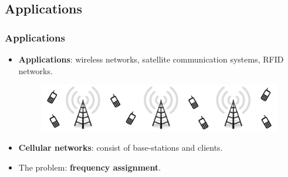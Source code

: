 \documentclass[xcolor=dvipsnames,aspectratio=1610]{beamer}
\begin{document}

  \subsection{Applications}


  \begin{frame}
    \frametitle{Applications}

    \begin{itemize}
      \item \textbf{Applications}: wireless networks, satellite communication systems, RFID networks.

      \pause
      \vfill

      \begin{figure}[h]
        \centering
        \includegraphics[width=12cm]{../figures/towers-slides.pdf}
      \end{figure}

      \vfill

      \item \textbf{Cellular networks}: consist of base-stations and clients.
      \pause
      \item The problem: \textbf{frequency assignment}.

    \end{itemize}

  \end{frame}
\end{document}
